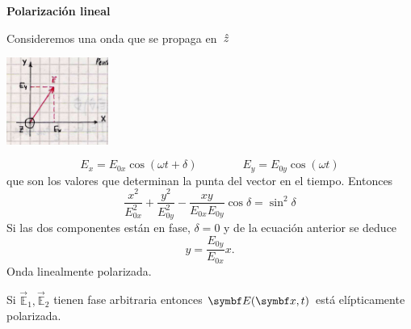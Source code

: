 \documentclass[10pt,oneside]{CBFT_book}
\begin{document}
\begin{ejemplo}{\bf Polarización lineal}

Consideremos una onda que se propaga en $\:\hat{z}$

\includegraphics[width=0.25\textwidth]{images/fig_ft1_ondas_polarizacion_lineal.jpg} 

\[
	E_x = E_{0x} \cos( \omega t + \delta ) \qquad \qquad 
	E_y = E_{0y} \cos( \omega t )
\]
que son los valores que determinan la punta del vector en el tiempo.
Entonces
\[
	\frac{x^2}{E^2_{0x}} + \frac{y^2}{E^2_{0y}} - \frac{xy}{E_{0x}E_{0y}} \cos\delta = \sin^2\delta
\]
Si las dos componentes están en fase, $\delta = 0$ y de la ecuación anterior se deduce
\[
	y = \frac{ E_{0y} }{ E_{0x} } x.
\]
Onda linealmente polarizada.
\end{ejemplo}


Si $\vec{\mathbb{E}}_1,\vec{\mathbb{E}}_2$ tienen fase arbitraria entonces $\vb{E}( \vb{x},t )$ está elípticamente 
polarizada.
\end{document}
